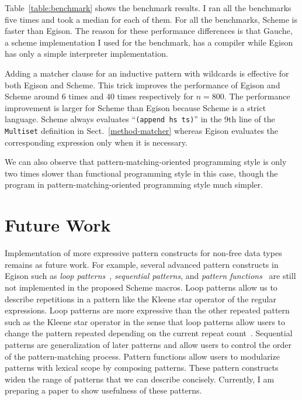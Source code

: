 \documentclass[acmlarge]{acmart}
\newcommand{\new}[1]{\textcolor{blue}{#1}}
\begin{document}
Table~\ref{table:benchmark} shows the benchmark results.
I ran all the benchmarks five times and took a median for each of them.
For all the benchmarks, Scheme is faster than Egison.
The reason for these performance differences is that Gauche, a scheme implementation I used for the benchmark, has a compiler while Egison has only a simple interpreter implementation.

Adding a matcher clause for an inductive pattern with wildcards is effective for both Egison and Scheme.
This trick improves the performance of Egison and Scheme around $6$ times and $40$ times respectively for $n=800$.
The performance improvement is larger for Scheme than Egison because Scheme is a strict language.
Scheme always evaluates ``\lstinline{(append hs ts)}'' in the 9th line of the \lstinline{Multiset} definition in Sect.~\ref{method-matcher} whereas Egison evaluates the corresponding expression only when it is necessary.

We can also observe that pattern-matching-oriented programming style is only two times slower than functional programming style in this case, though the program in pattern-matching-oriented programming style much simpler.

\section{Future Work}\label{future}

Implementation of more expressive pattern constructs for non-free data types remains as future work.
For example, several advanced pattern constructs in Egison such as \emph{loop patterns}~\cite{egi2018loop}, \emph{sequential patterns}, and \emph{pattern functions}~\cite{egisonPat} are still not implemented in the proposed Scheme macros.
Loop patterns allow us to describe repetitions in a pattern like the Kleene star operator of the regular expressions.
Loop patterns are more expressive than the other repeated pattern such as the Kleene star operator in the sense that loop patterns allow users to change the pattern repeated depending on the current repeat count~\cite{egi2018loop}.
Sequential patterns are generalization of later patterns and  allow users to control the order of the pattern-matching process.
Pattern functions allow users to modularize patterns with lexical scope by composing patterns.
These pattern constructs widen the range of patterns that we can describe concisely.
Currently, I am preparing a paper to show usefulness of these patterns.
\end{document}
